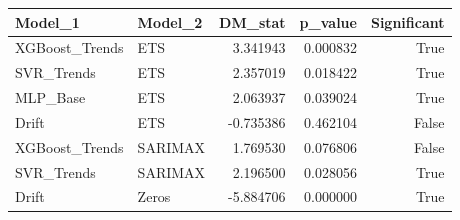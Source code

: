\begin{tabular}{llrrr}
\toprule
Model_1 & Model_2 & DM_stat & p_value & Significant \\
\midrule
XGBoost_Trends & ETS & 3.341943 & 0.000832 & True \\
SVR_Trends & ETS & 2.357019 & 0.018422 & True \\
MLP_Base & ETS & 2.063937 & 0.039024 & True \\
Drift & ETS & -0.735386 & 0.462104 & False \\
XGBoost_Trends & SARIMAX & 1.769530 & 0.076806 & False \\
SVR_Trends & SARIMAX & 2.196500 & 0.028056 & True \\
Drift & Zeros & -5.884706 & 0.000000 & True \\
\bottomrule
\end{tabular}
